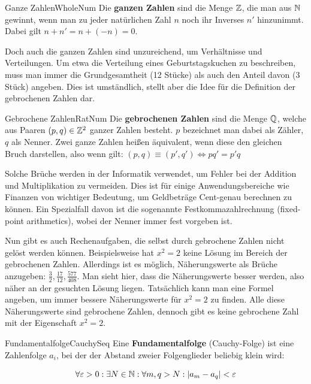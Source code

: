 \begin{definition}{Ganze Zahlen}{WholeNum}
	Die \textbf{ganzen Zahlen} sind die Menge $\mathbb{Z}$, die man aus $\mathbb{N}$ gewinnt, wenn man zu jeder natürlichen Zahl $n$ noch ihr Inverses $n'$ hinzunimmt. Dabei gilt $n+n' = n+(-n) = 0$.
\end{definition}

Doch auch die ganzen Zahlen sind unzureichend, um Verhältnisse und Verteilungen. Um etwa die Verteilung eines Geburtstagskuchen zu beschreiben, muss man immer die Grundgesamtheit (12 Stücke) als auch den Anteil
davon (3 Stück) angeben. Dies ist umständlich, stellt aber die Idee für die Definition der gebrochenen Zahlen dar.

\begin{definition}{Gebrochene Zahlen}{RatNum}
	Die \textbf{gebrochenen Zahlen} sind die Menge $\mathbb{Q}$, welche aus Paaren $(p,q) \in \mathbb{Z}^2$ ganzer Zahlen besteht. $p$ bezeichnet man dabei als Zähler, $q$ als Nenner. Zwei ganze Zahlen heißen äquivalent,  wenn
	diese den gleichen Bruch darstellen, also wenn gilt: $(p,q) \equiv (p',q') \iff pq'=p'q$
\end{definition}

Solche Brüche werden in der Informatik verwendet, um Fehler bei der Addition und Multiplikation zu vermeiden. Dies ist für einige Anwendungsbereiche wie Finanzen von wichtiger Bedeutung, um Geldbeträge
Cent-genau berechnen zu können. Ein Spezialfall davon ist die sogenannte Festkommazahlrechnung (fixed-point arithmetics), wobei der Nenner immer fest vorgeben ist.

Nun gibt es auch Rechenaufgaben, die selbst durch gebrochene Zahlen nicht gelöst werden können. Beispielsweise hat $x^2=2$ keine Lösung im Bereich der gebrochenen Zahlen. Allerdings ist es möglich,
Näherungswerte als Brüche anzugeben: $\frac{3}{2}, \frac{17}{12},\frac{577}{408}$. Man sieht hier, dass die Näherungswerte besser werden, also näher an der gesuchten Lösung liegen. Tatsächlich kann man
eine Formel angeben, um immer bessere Näherungswerte für $x^2=2$ zu finden. Alle diese Näherungswerte sind gebrochene Zahlen, dennoch gibt es keine gebrochene Zahl mit der Eigenschaft $x^2=2$.

\begin{definition}{Fundamentalfolge}{CauchySeq}
	Eine \textbf{Fundamentalfolge} (Cauchy-Folge) ist eine Zahlenfolge $a_i$, bei der der Abstand zweier Folgenglieder beliebig klein wird:

    \begin{equation}
        \forall \varepsilon > 0: \exists N \in \mathbb{N}: \forall m,q>N: |a_m-a_q|<\varepsilon
    \end{equation}
\end{definition}


